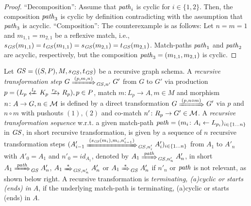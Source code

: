 \begin{proof}
``Decomposition'': Assume that $\mathit{path}_i$ is cyclic for $i \in \{1,2\}$.
Then, the composition $\mathit{path}_3$ is cyclic by definition contradicting with the assumption that $\mathit{path}_3$ is acyclic.
``Composition'': The counterexample is as follows: Let $n=m=1$ and $m_{1,1}=m_{2,1}$ be a reflexive match, i.e., $s_\mathit{GS}(m_{1,1})=t_\mathit{GS}(m_{1,1})=s_\mathit{GS}(m_{2,1})=t_\mathit{GS}(m_{2,1})$.
Match-paths $\mathit{path}_1$ and $\mathit{path}_2$ are acyclic, respectively, but the composition $\mathit{path}_3=(m_{1,1},m_{2,1})$ is cyclic.
\end{proof}

\begin{definition}
\label{def:sec-compl-software-trans:rec_trafo}
Let $\mathit{GS}=((S,P),M,s_\mathit{GS},t_\mathit{GS})$ be a recursive graph schema.
A \emph{recursive transformation step} $G \Trans{(p,m,n)}_{\GS,n'} G'$ from $G$ to $G'$ via production $p=(L_p \transB{l_p} K_p \trans{r_p} R_p), p \in P$, match $m\colon L_p \to A,m \in M$ and morphism $n\colon A \to G,n \in {\cal M}$ is defined by a direct transformation $G \Trans{(p,n \circ m)} G'$ via $p$ and $n \circ m$ with pushouts $(1),(2)$ and co-match $n'\colon R_p \to G' \in {\cal M}$.
A \emph{recursive transformation sequence} w.r.t. a given match-path $\mathit{path}=(m_i\colon A_i \gets L_{p_i})_{i \in \{1 \ldots n\}}$ in $\mathit{GS}$, in short recursive transformation, is given by a sequence of $n$ recursive transformation steps $(A'_{i-1} \Trans{(s_\GS(m_i),m_i,n'_{i-1})}_{\GS,n'_i} A'_i)_{i \in \{1 \ldots n\}}$ from $A_1$ to $A'_n$ with $A'_0=A_1$ and $n'_0=id_{A_1}$, denoted by $A_1 \Trans{\paths}_{\GS,n'_n} A'_n$, in short $A_1 \Trans{\paths}_\GS A'_n$, $A_1 \Trans{*}_{\GS,n'_n} A'_n$ or $A_1 \Trans{*}_\GS A'_n$ if $n'_n$ or $\mathit{path}$ is not relevant, as shown below right.
A recursive transformation is \emph{terminating, (a)cyclic or starts (ends) in $A$}, if the underlying match-path is terminating, (a)cyclic or starts (ends) in $A$.



\end{definition}
